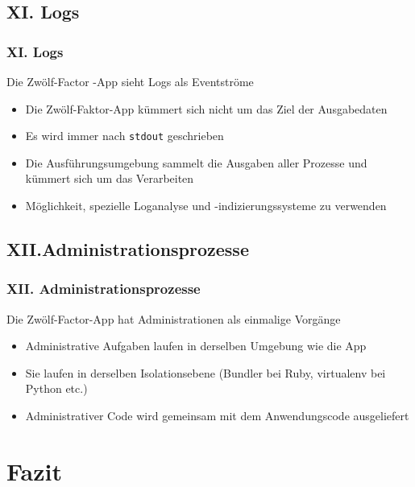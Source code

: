 \documentclass{beamer}
\begin{document}
			\subsection{XI. Logs}
				\begin{frame}
					\frametitle{XI. Logs}
					\begin{block}{Die Zwölf-Factor -App sieht Logs als Eventströme}
					\begin{itemize}
						\item Die Zwölf-Faktor-App kümmert sich nicht um das Ziel der Ausgabedaten
						\item Es wird immer nach \texttt{stdout} geschrieben
						\item Die Ausführungsumgebung sammelt die Ausgaben aller Prozesse und kümmert sich um das Verarbeiten
						\item Möglichkeit, spezielle Loganalyse und -indizierungssysteme zu verwenden
					\end{itemize}	
					\end{block}
				\end{frame}
			\subsection{XII.\@ Administrationsprozesse}
			\begin{frame}
				\frametitle{XII. Administrationsprozesse}
				\begin{block}{Die Zwölf-Factor-App hat Administrationen als einmalige Vorgänge}
					\begin{itemize}
						\item Administrative Aufgaben laufen in derselben Umgebung wie die App
						\item Sie laufen in derselben Isolationsebene (Bundler bei Ruby, virtualenv bei Python etc.)
						\item Administrativer Code wird gemeinsam mit dem Anwendungscode ausgeliefert
					\end{itemize}
				\end{block}
				
			
			\end{frame}
		\section{Fazit}
\end{document}
